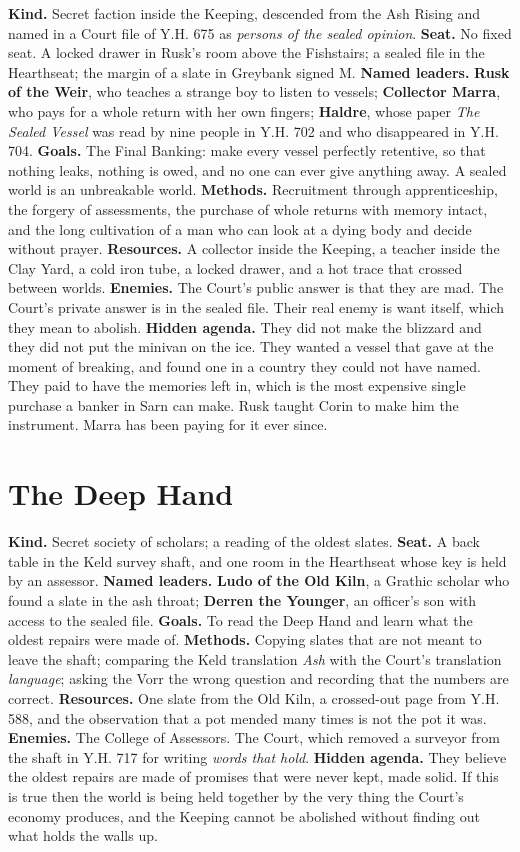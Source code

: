 \documentclass{design/chronicle}
\begin{document}
\textbf{Kind.} Secret faction inside the Keeping, descended from the Ash Rising and named in a Court file of Y.H. 675 as \emph{persons of the sealed opinion}. \textbf{Seat.} No fixed seat. A locked drawer in Rusk’s room above the Fishstairs; a sealed file in the Hearthseat; the margin of a slate in Greybank signed M. \textbf{Named leaders.} \textbf{Rusk of the Weir}, who teaches a strange boy to listen to vessels; \textbf{Collector Marra}, who pays for a whole return with her own fingers; \textbf{Haldre}, whose paper \emph{The Sealed Vessel} was read by nine people in Y.H. 702 and who disappeared in Y.H. 704. \textbf{Goals.} The Final Banking: make every vessel perfectly retentive, so that nothing leaks, nothing is owed, and no one can ever give anything away. A sealed world is an unbreakable world. \textbf{Methods.} Recruitment through apprenticeship, the forgery of assessments, the purchase of whole returns with memory intact, and the long cultivation of a man who can look at a dying body and decide without prayer. \textbf{Resources.} A collector inside the Keeping, a teacher inside the Clay Yard, a cold iron tube, a locked drawer, and a hot trace that crossed between worlds. \textbf{Enemies.} The Court’s public answer is that they are mad. The Court’s private answer is in the sealed file. Their real enemy is want itself, which they mean to abolish. \textbf{Hidden agenda.} They did not make the blizzard and they did not put the minivan on the ice. They wanted a vessel that gave at the moment of breaking, and found one in a country they could not have named. They paid to have the memories left in, which is the most expensive single purchase a banker in Sarn can make. Rusk taught Corin to make him the instrument. Marra has been paying for it ever since.

\section*{The Deep Hand}

\textbf{Kind.} Secret society of scholars; a reading of the oldest slates. \textbf{Seat.} A back table in the Keld survey shaft, and one room in the Hearthseat whose key is held by an assessor. \textbf{Named leaders.} \textbf{Ludo of the Old Kiln}, a Grathic scholar who found a slate in the ash throat; \textbf{Derren the Younger}, an officer’s son with access to the sealed file. \textbf{Goals.} To read the Deep Hand and learn what the oldest repairs were made of. \textbf{Methods.} Copying slates that are not meant to leave the shaft; comparing the Keld translation \emph{Ash} with the Court’s translation \emph{language}; asking the Vorr the wrong question and recording that the numbers are correct. \textbf{Resources.} One slate from the Old Kiln, a crossed-out page from Y.H. 588, and the observation that a pot mended many times is not the pot it was. \textbf{Enemies.} The College of Assessors. The Court, which removed a surveyor from the shaft in Y.H. 717 for writing \emph{words that hold}. \textbf{Hidden agenda.} They believe the oldest repairs are made of promises that were never kept, made solid. If this is true then the world is being held together by the very thing the Court’s economy produces, and the Keeping cannot be abolished without finding out what holds the walls up.
\end{document}
